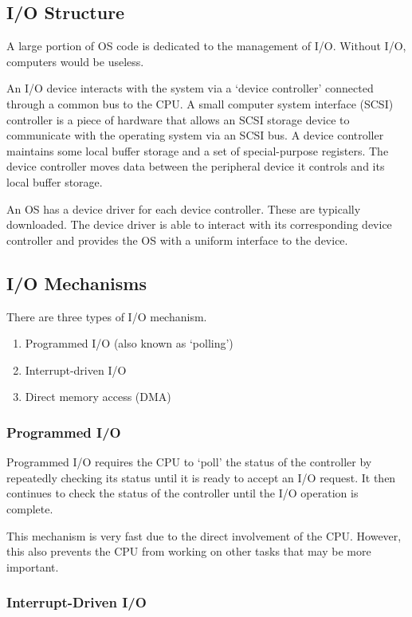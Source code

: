 \subsection{I/O Structure}

A large portion of OS code is dedicated to the management of I/O.
Without I/O, computers would be useless.

An I/O device interacts with the system via a `device controller' connected through a common bus to the CPU.
A small computer system interface (SCSI) controller is a piece of hardware that allows an SCSI storage device to communicate with the operating system via an SCSI bus.
A device controller maintains some local buffer storage and a set of special-purpose registers.
The device controller moves data between the peripheral device it controls and its local buffer storage.

An OS has a device driver for each device controller.
These are typically downloaded.
The device driver is able to interact with its corresponding device controller and provides the OS with a uniform interface to the device.

\subsection{I/O Mechanisms}

There are three types of I/O mechanism.
\begin{enumerate}
  \item Programmed I/O (also known as `polling')
  \item Interrupt-driven I/O
  \item Direct memory access (DMA)
\end{enumerate}

\subsubsection{Programmed I/O}

Programmed I/O requires the CPU to `poll' the status of the controller by repeatedly checking its status until it is ready to accept an I/O request.
It then continues to check the status of the controller until the I/O operation is complete.

This mechanism is very fast due to the direct involvement of the CPU.
However, this also prevents the CPU from working on other tasks that may be more important.

\subsubsection{Interrupt-Driven I/O}


